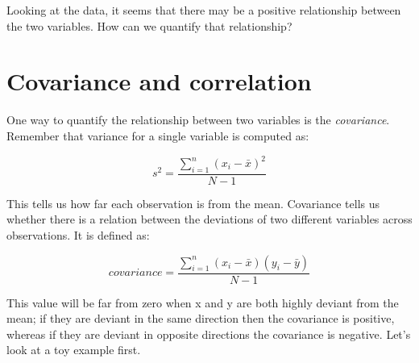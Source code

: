 \documentclass[]{book}
\newenvironment{Shaded}{\begin{snugshade}}{\end{snugshade}}
\newcommand{\KeywordTok}[1]{\textcolor[rgb]{0.13,0.29,0.53}{\textbf{#1}}}
\newcommand{\DataTypeTok}[1]{\textcolor[rgb]{0.13,0.29,0.53}{#1}}
\newcommand{\DecValTok}[1]{\textcolor[rgb]{0.00,0.00,0.81}{#1}}
\newcommand{\StringTok}[1]{\textcolor[rgb]{0.31,0.60,0.02}{#1}}
\newcommand{\CommentTok}[1]{\textcolor[rgb]{0.56,0.35,0.01}{\textit{#1}}}
\newcommand{\OperatorTok}[1]{\textcolor[rgb]{0.81,0.36,0.00}{\textbf{#1}}}
\newcommand{\NormalTok}[1]{#1}
\theoremstyle{definition}
\theoremstyle{definition}
\theoremstyle{definition}
\theoremstyle{remark}
\begin{document}
Looking at the data, it seems that there may be a positive relationship
between the two variables. How can we quantify that relationship?

\section{Covariance and correlation}\label{covariance-and-correlation}

One way to quantify the relationship between two variables is the
\emph{covariance}. Remember that variance for a single variable is
computed as:

\[
s^2 = \frac{\sum_{i=1}^n (x_i - \bar{x})^2}{N - 1}
\]

This tells us how far each observation is from the mean. Covariance
tells us whether there is a relation between the deviations of two
different variables across observations. It is defined as:

\[
covariance = \frac{\sum_{i=1}^n (x_i - \bar{x})(y_i - \bar{y})}{N - 1}
\]

This value will be far from zero when x and y are both highly deviant
from the mean; if they are deviant in the same direction then the
covariance is positive, whereas if they are deviant in opposite
directions the covariance is negative. Let's look at a toy example
first.

\begin{Shaded}
\end{Shaded}
\end{document}
